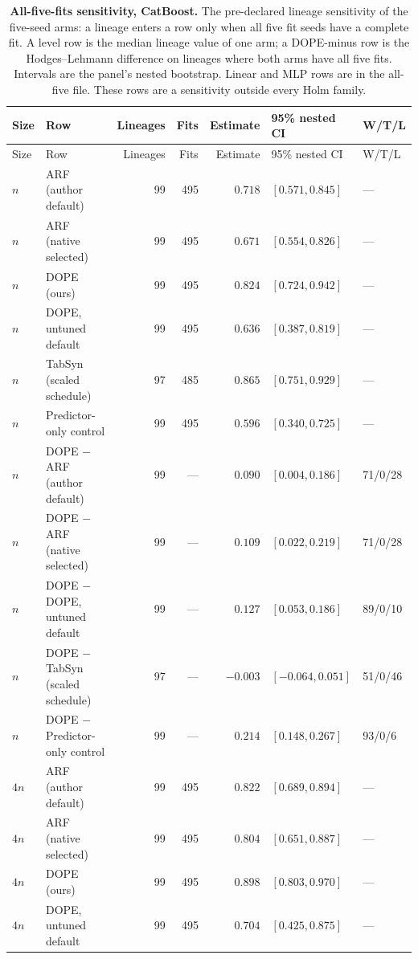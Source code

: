 \begin{longtable}{llrrrll}
\caption{\textbf{All-five-fits sensitivity, CatBoost.} The pre-declared lineage sensitivity of the five-seed arms: a lineage enters a row only when all five fit seeds have a complete fit. A level row is the median lineage value of one arm; a DOPE-minus row is the Hodges--Lehmann difference on lineages where both arms have all five fits. Intervals are the panel's nested bootstrap. Linear and MLP rows are in the all-five file. These rows are a sensitivity outside every Holm family.}\label{tab:v2-all-five}\\
\toprule
Size & Row & Lineages & Fits & Estimate & 95\% nested CI & W/T/L \\
\midrule
\endfirsthead
\toprule
Size & Row & Lineages & Fits & Estimate & 95\% nested CI & W/T/L \\
\midrule
\endhead
$n$ & ARF (author default) & 99 & 495 & $0.718$ & $[0.571, 0.845]$ & --- \\
$n$ & ARF (native selected) & 99 & 495 & $0.671$ & $[0.554, 0.826]$ & --- \\
$n$ & DOPE (ours) & 99 & 495 & $0.824$ & $[0.724, 0.942]$ & --- \\
$n$ & DOPE, untuned default & 99 & 495 & $0.636$ & $[0.387, 0.819]$ & --- \\
$n$ & TabSyn (scaled schedule) & 97 & 485 & $0.865$ & $[0.751, 0.929]$ & --- \\
$n$ & Predictor-only control & 99 & 495 & $0.596$ & $[0.340, 0.725]$ & --- \\
$n$ & DOPE $-$ ARF (author default) & 99 & --- & $0.090$ & $[0.004, 0.186]$ & 71/0/28 \\
$n$ & DOPE $-$ ARF (native selected) & 99 & --- & $0.109$ & $[0.022, 0.219]$ & 71/0/28 \\
$n$ & DOPE $-$ DOPE, untuned default & 99 & --- & $0.127$ & $[0.053, 0.186]$ & 89/0/10 \\
$n$ & DOPE $-$ TabSyn (scaled schedule) & 97 & --- & $-0.003$ & $[-0.064, 0.051]$ & 51/0/46 \\
$n$ & DOPE $-$ Predictor-only control & 99 & --- & $0.214$ & $[0.148, 0.267]$ & 93/0/6 \\
$4n$ & ARF (author default) & 99 & 495 & $0.822$ & $[0.689, 0.894]$ & --- \\
$4n$ & ARF (native selected) & 99 & 495 & $0.804$ & $[0.651, 0.887]$ & --- \\
$4n$ & DOPE (ours) & 99 & 495 & $0.898$ & $[0.803, 0.970]$ & --- \\
$4n$ & DOPE, untuned default & 99 & 495 & $0.704$ & $[0.425, 0.875]$ & --- \\

\end{longtable}
